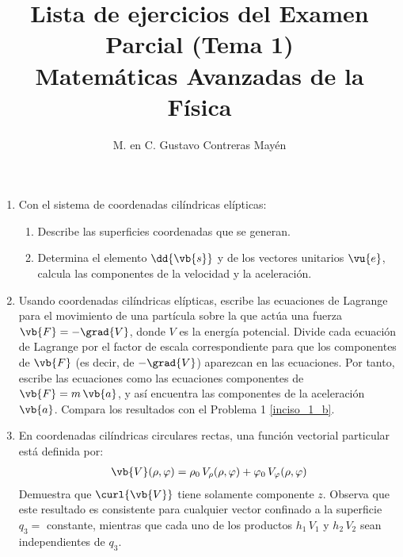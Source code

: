 

\title{Lista de ejercicios del Examen Parcial (Tema 1) \\[0.3em]  \large{Matemáticas Avanzadas de la Física}\vspace{-3ex}}
\author{M. en C. Gustavo Contreras Mayén}
\date{ }

\vspace{-4cm}
\maketitle

\fontsize{14}{14}\selectfont

\begin{enumerate}
\item Con el sistema de coordenadas cilíndricas elípticas:
\begin{enumerate}[label=\alph*)]
\item Describe las superficies coordenadas que se generan.
\item \label{inciso_1_b} Determina el elemento $\dd{\vb{s}}$ y de los vectores unitarios $\vu{e}$, calcula las componentes de la velocidad y la aceleración.
\end{enumerate}
\item Usando coordenadas cilíndricas elípticas, escribe las ecuaciones de Lagrange para el movimiento de una partícula sobre la que actúa una fuerza $\vb{F} = - \grad{V}$, donde $V$ es la energía potencial. Divide cada ecuación de Lagrange por el factor de escala correspondiente para que los componentes de $\vb{F}$ (es decir, de $- \grad{V}$) aparezcan en las ecuaciones. Por tanto, escribe las ecuaciones como las ecuaciones componentes de $\vb{F} = m \, \vb{a}$, y así encuentra las componentes de la aceleración $\vb{a}$. Compara los resultados con el Problema 1 \ref{inciso_1_b}.
\item En coordenadas cilíndricas circulares rectas, una función vectorial particular está definida por:
\begin{align*}
\vb{V} (\rho, \varphi) = \rho_{0} \, V_{\rho} (\rho, \varphi) + \varphi_{0} \, V_{\varphi} (\rho, \varphi)
\end{align*}
Demuestra que $\curl{\vb{V}}$ tiene solamente componente $z$. Observa que este resultado es consistente para cualquier vector confinado a la superficie $q_{3} =$ constante, mientras que cada uno de los productos $h_{1} \, V_{1}$ y $h_{2} \, V_{2}$ sean independientes de $q_{3}$.

\end{enumerate}
